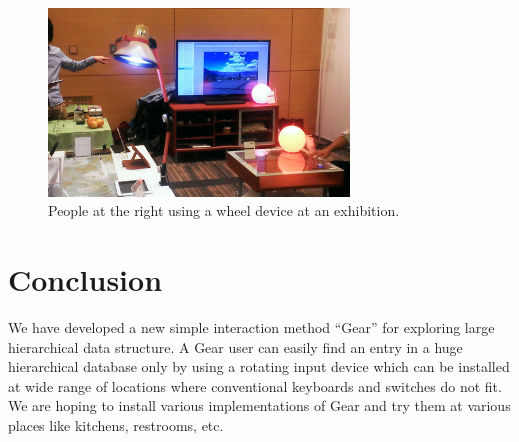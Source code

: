 \documentclass[conference]{IEEEtran}
\begin{document}
\begin{figure}[H]
\centerline{\includegraphics[width=80mm,bb=0 0 527 329]{figures/c520d5dfbd06c532d48d324a7019b00c.png}}
\caption{People at the right using a wheel device at an exhibition.}
\label{exhibition}
\end{figure}


\section{Conclusion}

We have developed a new simple interaction method ``Gear'' for exploring
large hierarchical data structure.
A Gear user can easily find an entry in a huge hierarchical database
only by using a rotating input device which can be installed at
wide range of locations where conventional keyboards and switches do not fit.
We are hoping to install various implementations of Gear and try them at
various places like kitchens, restrooms, etc.

\small{


}
\end{document}
